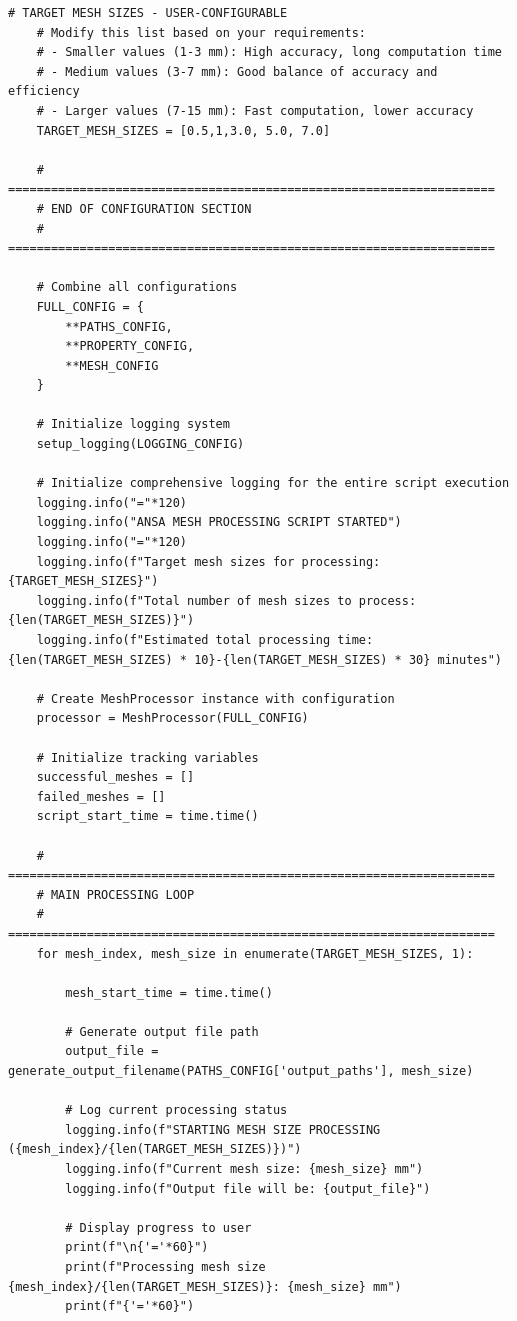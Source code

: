 \documentclass{book}
\begin{document}
\begin{itemize}[leftmargin=*,label=\textbullet]
\begin{itemize}
\begin{lstlisting}[caption={Phase 1 Meshing Automation Script},label={lst:phase1}]
    # TARGET MESH SIZES - USER-CONFIGURABLE
    # Modify this list based on your requirements:
    # - Smaller values (1-3 mm): High accuracy, long computation time
    # - Medium values (3-7 mm): Good balance of accuracy and efficiency  
    # - Larger values (7-15 mm): Fast computation, lower accuracy
    TARGET_MESH_SIZES = [0.5,1,3.0, 5.0, 7.0]
    
    # ====================================================================
    # END OF CONFIGURATION SECTION
    # ====================================================================
    
    # Combine all configurations
    FULL_CONFIG = {
        **PATHS_CONFIG,
        **PROPERTY_CONFIG,
        **MESH_CONFIG
    }
    
    # Initialize logging system
    setup_logging(LOGGING_CONFIG)
    
    # Initialize comprehensive logging for the entire script execution
    logging.info("="*120)
    logging.info("ANSA MESH PROCESSING SCRIPT STARTED")
    logging.info("="*120)
    logging.info(f"Target mesh sizes for processing: {TARGET_MESH_SIZES}")
    logging.info(f"Total number of mesh sizes to process: {len(TARGET_MESH_SIZES)}")
    logging.info(f"Estimated total processing time: {len(TARGET_MESH_SIZES) * 10}-{len(TARGET_MESH_SIZES) * 30} minutes")
    
    # Create MeshProcessor instance with configuration
    processor = MeshProcessor(FULL_CONFIG)
    
    # Initialize tracking variables
    successful_meshes = []
    failed_meshes = []
    script_start_time = time.time()
    
    # ====================================================================
    # MAIN PROCESSING LOOP
    # ====================================================================
    for mesh_index, mesh_size in enumerate(TARGET_MESH_SIZES, 1):
        
        mesh_start_time = time.time()
        
        # Generate output file path
        output_file = generate_output_filename(PATHS_CONFIG['output_paths'], mesh_size)
        
        # Log current processing status
        logging.info(f"STARTING MESH SIZE PROCESSING ({mesh_index}/{len(TARGET_MESH_SIZES)})")
        logging.info(f"Current mesh size: {mesh_size} mm")
        logging.info(f"Output file will be: {output_file}")
        
        # Display progress to user
        print(f"\n{'='*60}")
        print(f"Processing mesh size {mesh_index}/{len(TARGET_MESH_SIZES)}: {mesh_size} mm")
        print(f"{'='*60}")
        

\end{lstlisting}
\end{itemize}
\end{itemize}
\end{document}

